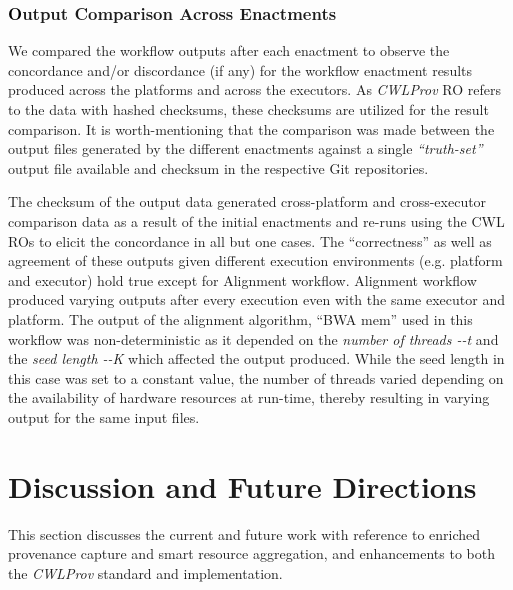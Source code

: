 \documentclass[a4paper,num-refs]{oup-contemporary}
\begin{document}
\subsubsection{\textcolor{black}Output Comparison Across Enactments}
We compared the workflow outputs after each enactment to observe the concordance and/or discordance (if any) for the workflow enactment results produced across the platforms and across the executors. As \textit{CWLProv} RO refers to the data with hashed checksums, these checksums are utilized for the result comparison. It is worth-mentioning that the comparison was made between the output files generated by the different enactments against a single \textit{``truth-set''} output file available and checksum in the respective Git repositories. 

The checksum of the output data generated cross-platform and cross-executor comparison data as a result of the initial enactments and re-runs using the CWL ROs to elicit the concordance in all but one cases. The ``correctness'' as well as agreement of these outputs given different execution environments (e.g. platform and executor) hold true except for Alignment workflow. Alignment workflow produced varying outputs after every execution even with the same executor and platform. The output of the alignment algorithm, ``BWA mem'' used in this workflow was non-deterministic as it depended on the \textit{number of threads -{}-t} and the \textit{seed length -{}-K} which affected the output produced. While the seed length in this case was set to a constant value, the number of threads varied depending on the availability of hardware resources at run-time, thereby resulting in varying output for the same input files.

\section{Discussion and Future Directions} \label{sec:discussion}
This section discusses the current and future work with reference to enriched provenance capture and smart resource aggregation, and enhancements to both the \textit{CWLProv} standard and implementation. 
\end{document}
